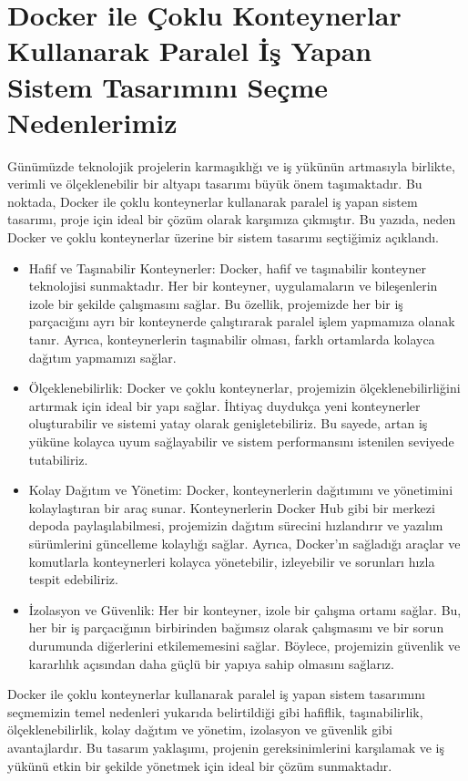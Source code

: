 \section{Docker ile Çoklu Konteynerlar Kullanarak Paralel İş Yapan Sistem Tasarımını Seçme Nedenlerimiz}
Günümüzde teknolojik projelerin karmaşıklığı ve iş yükünün artmasıyla birlikte, verimli ve ölçeklenebilir bir altyapı tasarımı büyük önem taşımaktadır.
 Bu noktada, Docker ile çoklu konteynerlar kullanarak paralel iş yapan sistem tasarımı, proje için ideal bir çözüm olarak karşımıza çıkmıştır.
  Bu yazıda, neden Docker ve çoklu konteynerlar üzerine bir sistem tasarımı seçtiğimiz açıklandı.\\
\begin{itemize}
   \item Hafif ve Taşınabilir Konteynerler:
    Docker, hafif ve taşınabilir konteyner teknolojisi sunmaktadır. Her bir konteyner, uygulamaların ve bileşenlerin izole bir şekilde çalışmasını sağlar. Bu özellik, projemizde her bir iş parçacığını ayrı bir konteynerde çalıştırarak paralel işlem yapmamıza olanak tanır. Ayrıca, konteynerlerin taşınabilir olması, farklı ortamlarda kolayca dağıtım yapmamızı sağlar.
    
   \item  Ölçeklenebilirlik:
    Docker ve çoklu konteynerlar, projemizin ölçeklenebilirliğini artırmak için ideal bir yapı sağlar. İhtiyaç duydukça yeni konteynerler oluşturabilir ve sistemi yatay olarak genişletebiliriz. Bu sayede, artan iş yüküne kolayca uyum sağlayabilir ve sistem performansını istenilen seviyede tutabiliriz.
    
   \item Kolay Dağıtım ve Yönetim:
    Docker, konteynerlerin dağıtımını ve yönetimini kolaylaştıran bir araç sunar. Konteynerlerin Docker Hub gibi bir merkezi depoda paylaşılabilmesi, projemizin dağıtım sürecini hızlandırır ve yazılım sürümlerini güncelleme kolaylığı sağlar. Ayrıca, Docker'ın sağladığı araçlar ve komutlarla konteynerleri kolayca yönetebilir, izleyebilir ve sorunları hızla tespit edebiliriz.
    
   \item İzolasyon ve Güvenlik:
    Her bir konteyner, izole bir çalışma ortamı sağlar. Bu, her bir iş parçacığının birbirinden bağımsız olarak çalışmasını ve bir sorun durumunda diğerlerini etkilememesini sağlar. Böylece, projemizin güvenlik ve kararlılık açısından daha güçlü bir yapıya sahip olmasını sağlarız.
    \end{itemize}
    Docker ile çoklu konteynerlar kullanarak paralel iş yapan sistem tasarımını seçmemizin temel nedenleri yukarıda belirtildiği gibi hafiflik, taşınabilirlik, ölçeklenebilirlik, kolay dağıtım ve yönetim, izolasyon ve güvenlik gibi avantajlardır. Bu tasarım yaklaşımı, projenin gereksinimlerini karşılamak ve iş yükünü etkin bir şekilde yönetmek için ideal bir çözüm sunmaktadır.

